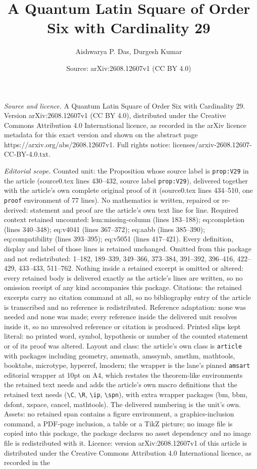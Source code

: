 \documentclass[10pt,a4paper]{amsart}
\title[A Quantum Latin Square of Order Six with Cardinality 29]{A Quantum Latin Square of Order Six with Cardinality 29}
\author{Aishwarya P. Das, Durgesh Kumar}
\date{Source: arXiv:2608.12607v1 (CC BY 4.0)}
\begin{document}
\maketitle

\noindent\emph{Source and licence.} A Quantum Latin Square of Order Six with Cardinality 29. Version arXiv:2608.12607v1 (CC BY 4.0), distributed under the Creative Commons Attribution 4.0 International licence, as recorded in the arXiv licence metadata for this exact version and shown on the abstract page https://arxiv.org/abs/2608.12607v1. Full rights notice: licenses/arxiv-2608.12607-CC-BY-4.0.txt.\par\smallskip

\noindent\textit{Editorial scope.} Counted unit: the Proposition whose source label is \texttt{prop:V29} in the article (source0.tex lines 430--432, source label \texttt{prop:V29}), delivered together with the article's own complete original proof of it (source0.tex lines 434--510, one \texttt{proof} environment of 77 lines). No mathematics is written, repaired or re-derived: statement and proof are the article's own text line for line. Required context retained uncounted: lem:missing-column (lines 183--188); eq:completion (lines 340--348); eq:v4041 (lines 367--372); eq:aabb (lines 385--390); eq:compatibility (lines 393--395); eq:v5051 (lines 417--421). Every definition, display and label of those lines is retained unchanged. Omitted from this package and not redistributed: 1--182, 189--339, 349--366, 373--384, 391--392, 396--416, 422--429, 433--433, 511--762. Nothing inside a retained excerpt is omitted or altered: every retained body is delivered exactly as the article's lines are written, so no omission receipt of any kind accompanies this package. Citations: the retained excerpts carry no citation command at all, so no bibliography entry of the article is transcribed and no reference is redistributed. Reference adaptation: none was needed and none was made; every reference inside the delivered unit resolves inside it, so no unresolved reference or citation is produced. Printed slips kept literal: no printed word, symbol, hypothesis or number of the counted statement or of its proof was altered. Layout and class: the article's own class is \texttt{article} with packages including geometry, amsmath, amssymb, amsthm, mathtools, booktabs, microtype, hyperref, lmodern; the wrapper is the lane's pinned \texttt{amsart} editorial wrapper at 10pt on A4, which restates the theorem-like environments the retained text needs and adds the article's own macro definitions that the retained text needs (\texttt{\textbackslash C}, \texttt{\textbackslash R}, \texttt{\textbackslash ip}, \texttt{\textbackslash spn}), with extra wrapper packages (bm, bbm, dsfont, xspace, cancel, mathtools). The delivered numbering is the unit's own. Assets: no retained span contains a figure environment, a graphics-inclusion command, a PDF-page inclusion, a table or a TikZ picture; no image file is copied into this package, the package declares no asset dependency and no image file is redistributed with it. Licence: version arXiv:2608.12607v1 of this article is distributed under the Creative Commons Attribution 4.0 International licence, as recorded in the 
\end{document}
